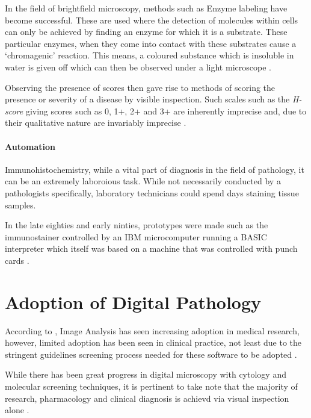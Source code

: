 \documentclass[12pt]{article}
\begin{document}
In the field of brightfield microscopy, methods such as Enzyme labeling have become successful. These are used where 
the detection of molecules within cells can only be achieved by finding an enzyme for which it is a substrate. These 
particular enzymes, when they come into contact with these substrates cause a `chromagenic' reaction. This means, a 
coloured substance which is insoluble in water is given off which can then be observed under a light microscope 
\parencite[Ch.~2]{buchwalow2010immunohistochemistry} .

Observing the presence of scores then gave rise to methods of scoring the presence or severity of a disease by visible 
inspection. Such scales such as the \emph{H-score} giving scores such as 0, 1+, 2+ and 3+ are inherently imprecise and, 
due to their qualitative nature are invariably imprecise \parencite[Ch.~23]{dabbs2013diagnostic}.

\paragraph{Automation}

Immunohistochemistry, while a vital part of diagnosis in the field of pathology, it can be an extremely laboroious 
task. While not necessarily conducted by a pathologists specifically, laboratory technicians could spend days 
staining tissue samples.

In the late eighties and early ninties, prototypes were made such as the immunostainer controlled by an IBM 
microcomputer running a BASIC interpreter which itself was based on a machine that was controlled with punch cards 
\parencite{mawhinney1990automated}.

\section{Adoption of Digital Pathology}
According to \citeauthor{dabbs2013diagnostic}, Image Analysis has seen increasing adoption in medical research, 
however, limited adoption has been seen in clinical practice, not least due to the stringent guidelines screening 
process needed for these software to be adopted \parencite[Ch.~23]{dabbs2013diagnostic}.

While there has been great progress in digital microscopy with cytology and molecular screening techniques, it is 
pertinent to take note that the majority of research, pharmacology and clinical diagnosis is achievd via visual 
inspection alone \parencite[p.~24]{mccavigan2012digital}.
\end{document}
